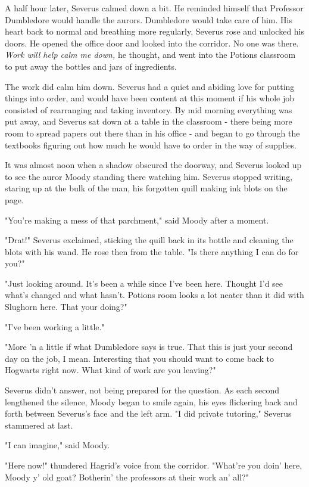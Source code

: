 A half hour later, Severus calmed down a bit. He reminded himself that Professor Dumbledore would handle the aurors. Dumbledore would take care of him. His heart back to normal and breathing more regularly, Severus rose and unlocked his doors. He opened the office door and looked into the corridor. No one was there. \emph{Work will help calm me down,} he thought, and went into the Potions classroom to put away the bottles and jars of ingredients.

The work did calm him down. Severus had a quiet and abiding love for putting things into order, and would have been content at this moment if his whole job consisted of rearranging and taking inventory. By mid morning everything was put away, and Severus sat down at a table in the classroom - there being more room to spread papers out there than in his office - and began to go through the textbooks figuring out how much he would have to order in the way of supplies.

It was almost noon when a shadow obscured the doorway, and Severus looked up to see the auror Moody standing there watching him. Severus stopped writing, staring up at the bulk of the man, his forgotten quill making ink blots on the page.

"You're making a mess of that parchment," said Moody after a moment.

"Drat!" Severus exclaimed, sticking the quill back in its bottle and cleaning the blots with his wand. He rose then from the table. "Is there anything I can do for you?"

"Just looking around. It's been a while since I've been here. Thought I'd see what's changed and what hasn't. Potions room looks a lot neater than it did with Slughorn here. That your doing?"

"I've been working a little."

"More 'n a little if what Dumbledore says is true. That this is just your second day on the job, I mean. Interesting that you should want to come back to Hogwarts right now. What kind of work are you leaving?"

Severus didn't answer, not being prepared for the question. As each second lengthened the silence, Moody began to smile again, his eyes flickering back and forth between Severus's face and the left arm. "I{\el} did{\el} private tutoring," Severus stammered at last.

"I can imagine," said Moody.

"Here now!" thundered Hagrid's voice from the corridor. "What're you doin' here, Moody y' old goat? Botherin' the professors at their work an' all?"

